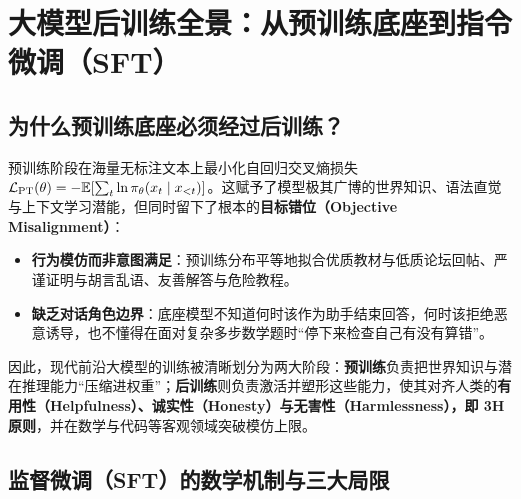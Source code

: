 \section{大模型后训练全景：从预训练底座到指令微调（SFT）}
\label{sec:posttrain-sft}

\subsection{为什么预训练底座必须经过后训练？}

预训练阶段在海量无标注文本上最小化自回归交叉熵损失 $\mathcal{L}_{\mathrm{PT}}(\theta) = -\mathbb{E}[\sum_t \ln \pi_\theta(x_t \mid x_{<t})]$。这赋予了模型极其广博的世界知识、语法直觉与上下文学习潜能，但同时留下了根本的\textbf{目标错位（Objective Misalignment）}：
\begin{itemize}
  \item \textbf{行为模仿而非意图满足}：预训练分布平等地拟合优质教材与低质论坛回帖、严谨证明与胡言乱语、友善解答与危险教程。
  \item \textbf{缺乏对话角色边界}：底座模型不知道何时该作为助手结束回答，何时该拒绝恶意诱导，也不懂得在面对复杂多步数学题时“停下来检查自己有没有算错”。
\end{itemize}
因此，现代前沿大模型的训练被清晰划分为两大阶段：\textbf{预训练}负责把世界知识与潜在推理能力“压缩进权重”；\textbf{后训练}则负责激活并塑形这些能力，使其对齐人类的\textbf{有用性（Helpfulness）、诚实性（Honesty）与无害性（Harmlessness），即 3H 原则}，并在数学与代码等客观领域突破模仿上限。

\subsection{监督微调（SFT）的数学机制与三大局限}

